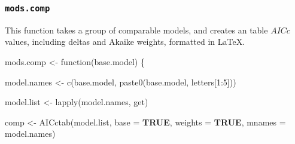 \documentclass[
  bookmarksnumbered]{article}
\newenvironment{Shaded}{\begin{snugshade}}{\end{snugshade}}
\newcommand{\AttributeTok}[1]{\textcolor[rgb]{0.80,0.80,0.80}{#1}}
\newcommand{\ConstantTok}[1]{\textcolor[rgb]{0.86,0.64,0.64}{\textbf{#1}}}
\newcommand{\ControlFlowTok}[1]{\textcolor[rgb]{0.94,0.87,0.69}{#1}}
\newcommand{\DecValTok}[1]{\textcolor[rgb]{0.86,0.86,0.80}{#1}}
\newcommand{\FunctionTok}[1]{\textcolor[rgb]{0.94,0.94,0.56}{#1}}
\newcommand{\NormalTok}[1]{\textcolor[rgb]{0.80,0.80,0.80}{#1}}
\newcommand{\OtherTok}[1]{\textcolor[rgb]{0.94,0.94,0.56}{#1}}
\newcommand{\SpecialCharTok}[1]{\textcolor[rgb]{0.86,0.64,0.64}{#1}}
\begin{document}
\subsubsection{\texorpdfstring{\texttt{mods.comp}}{mods.comp}}\label{mods.comp}

This function takes a group of comparable models, and creates an table \(AICc\) values, including deltas and Akaike weights, formatted in \LaTeX.

\begin{Shaded}
\begin{Highlighting}[]
\NormalTok{mods.comp }\OtherTok{\textless{}{-}} \ControlFlowTok{function}\NormalTok{(base.model) \{}
  
\NormalTok{  model.names }\OtherTok{\textless{}{-}} \FunctionTok{c}\NormalTok{(base.model, }\FunctionTok{paste0}\NormalTok{(base.model, letters[}\DecValTok{1}\SpecialCharTok{:}\DecValTok{5}\NormalTok{]))}
  
\NormalTok{  model.list }\OtherTok{\textless{}{-}} \FunctionTok{lapply}\NormalTok{(model.names, get)}
  
\NormalTok{  comp }\OtherTok{\textless{}{-}} \FunctionTok{AICctab}\NormalTok{(model.list,}
                  \AttributeTok{base =} \ConstantTok{TRUE}\NormalTok{, }
                  \AttributeTok{weights =} \ConstantTok{TRUE}\NormalTok{,}
                  \AttributeTok{mnames =}\NormalTok{ model.names)}
  

\end{Highlighting}
\end{Shaded}
\end{document}
